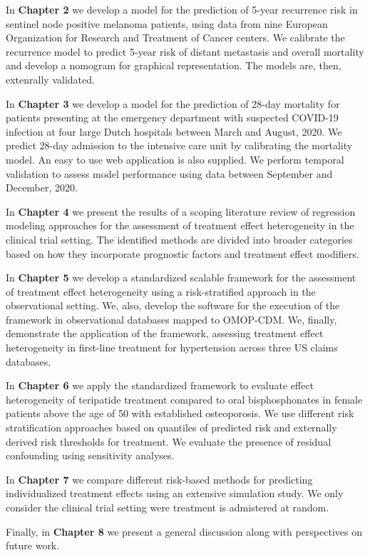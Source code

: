 \documentclass[
]{book}
\begin{document}
In \textbf{Chapter 2} we develop a model for the prediction of 5-year recurrence risk
in sentinel node positive melanoma patients, using data from nine European
Organization for Research and Treatment of Cancer centers. We calibrate the
recurrence model to predict 5-year risk of distant metastasis and overall
mortality and develop a nomogram for graphical representation. The models are,
then, extenrally validated.

In \textbf{Chapter 3} we develop a model for the prediction of 28-day mortality for
patients presenting at the emergency department with suspected COVID-19
infection at four large Dutch hospitals between March and August, 2020. We
predict 28-day admission to the intensive care unit by calibrating the mortality
model. An easy to use web application is also supplied. We perform temporal
validation to assess model performance using data between September and
December, 2020.

In \textbf{Chapter 4} we present the results of a scoping literature review of
regression modeling approaches for the assessment of treatment effect
heterogeneity in the clinical trial setting. The identified methods are divided
into broader categories based on how they incorporate prognostic factors and
treatment effect modifiers.

In \textbf{Chapter 5} we develop a standardized scalable framework for the assessment
of treatment effect heterogeneity using a risk-stratified approach in the
observational setting. We, also, develop the software for the execution of the
framework in observational databases mapped to OMOP-CDM. We, finally,
demonstrate the application of the framework, assessing treatment effect
heterogeneity in first-line treatment for hypertension across three US claims
databases.

In \textbf{Chapter 6} we apply the standardized framework to evaluate effect
heterogeneity of teripatide treatment compared to oral bisphosphonates in female
patients above the age of 50 with established osteoporosis. We use different
risk stratification approaches based on quantiles of predicted risk and
externally derived risk thresholds for treatment. We evaluate the presence of
residual confounding using sensitivity analyses.

In \textbf{Chapter 7} we compare different risk-based methods for predicting
individualized treatment effects using an extensive simulation study. We only
consider the clinical trial setting were treatment is admistered at random.

Finally, in \textbf{Chapter 8} we present a general discussion along with perspectives on
future work.
\end{document}
